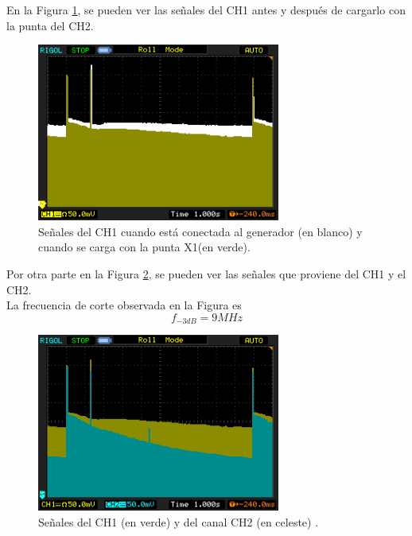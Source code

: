 \documentclass[a4paper,10pt]{article}
\begin{document}
		\indent En la Figura \ref{img003}, se pueden ver las se\~nales del CH1
		antes y despu\'es de cargarlo con la punta del CH2. 
		
		\begin{figure}[!htb]
			\centering
			\includegraphics[width=8cm]
			{Imagenes/Mediciones instrumentos/NewFile4.png}
			\caption{Se\~nales del CH1 cuando est\'a conectada al generador 
			(en blanco) y cuando se carga con la punta X1(en verde).} 
			\label{img003}
		\end{figure}
		
		\indent Por otra parte en la Figura \ref{img002}, se pueden ver las 
		se\~nales que proviene del CH1 y el CH2. \\
		\indent La frecuencia de corte observada en la Figura es 
		$$f_{-3dB}=9MHz$$
		
		\begin{figure}[!htb]
			\centering
			\includegraphics[width=8cm]
			{Imagenes/Mediciones instrumentos/NewFile3.png}
			\caption{Se\~nales del CH1 (en verde) y del canal CH2 (en celeste)
			.} \label{img002}
		\end{figure}						
		
\end{document}
